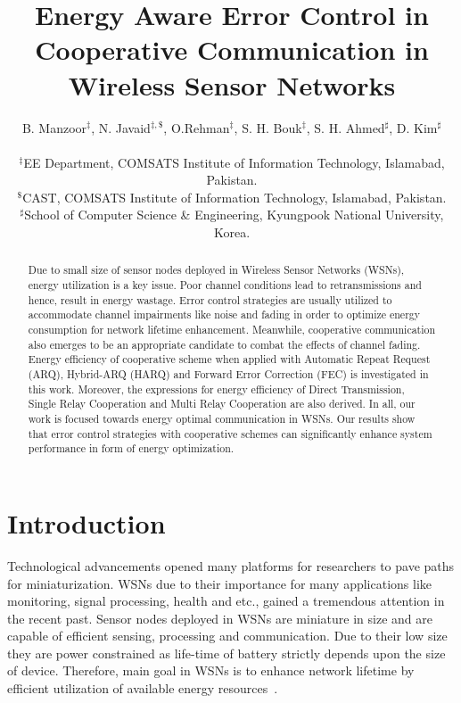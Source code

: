 \documentclass{sig-alternate}
\begin{document}
\title{Energy Aware Error Control in Cooperative Communication in Wireless Sensor Networks}

\author{B. Manzoor$^{\ddag}$, N. Javaid$^{\ddag, \$}$, O.Rehman$^{\ddag}$, S. H. Bouk$^{\ddag}$, S. H. Ahmed$^{\sharp}$, D. Kim$^{\sharp}$\\\\
$^{\ddag}$EE Department, COMSATS Institute of Information Technology, Islamabad, Pakistan. \\
        $^{\$}$CAST, COMSATS Institute of Information Technology, Islamabad, Pakistan.\\
        $^{\sharp}$School of Computer Science \& Engineering, Kyungpook National University, Korea.\\
}

\maketitle
\begin{abstract}
Due to small size of sensor nodes deployed in Wireless Sensor Networks (WSNs), energy utilization is a key issue. Poor channel conditions lead to retransmissions and hence, result in energy wastage. Error control strategies are usually utilized to accommodate channel impairments like noise and fading in order to optimize energy consumption for network lifetime enhancement. Meanwhile, cooperative communication also emerges to be an appropriate candidate to combat the effects of channel fading. Energy efficiency of cooperative scheme when applied with Automatic Repeat Request (ARQ), Hybrid-ARQ (HARQ) and Forward Error Correction (FEC) is investigated in this work. Moreover, the expressions for energy efficiency of Direct Transmission, Single Relay Cooperation and Multi Relay Cooperation are also derived. In all, our work is focused towards energy optimal communication in WSNs. Our results show that error control strategies with cooperative schemes can significantly enhance system performance in form of energy optimization.
\end{abstract}



\section{Introduction}
\label{sec:intro}

Technological advancements opened many platforms for researchers to pave paths for miniaturization. WSNs due to their importance for many applications like monitoring, signal processing, health and etc., gained a tremendous attention in the recent past. Sensor nodes deployed in WSNs are miniature in size and are capable of efficient sensing, processing and communication. Due to their low size they are power constrained as life-time of battery strictly depends upon the size of device. Therefore, main goal in WSNs is to enhance network lifetime by efficient utilization of available energy resources~\cite{10}.
\end{document}
